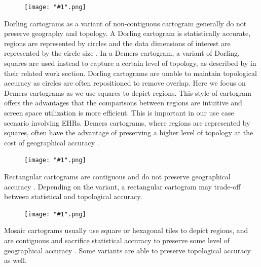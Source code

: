 \documentclass[Afour,sagev,times]{sagej}
\newcommand{\thumbnail}[2]{
    \begin{samepage}

      \setlength{\intextsep}{3pt}
      \setlength{\columnsep}{3pt}
      \begin{figure}
        \vspace{-15pt}
        \begin{center}
          \texttt{[image: "\#1".png]}
        \end{center}
      \end{figure}
      #2
      
    \end{samepage}
}
\begin{document}
\thumbnail{dorling}{
    Dorling cartograms as a variant of non-contiguous cartogram generally do not preserve geography and topology.
    A Dorling cartogram is statistically accurate, regions are represented by circles and the data dimensions of interest are represented by the circle size \cite{dorling2011Area}.
    In a Demers cartogram, a variant of Dorling, squares are used instead to capture a certain level of topology, as described by \citet{cano2015Mosaic} in their related work section.
    Dorling cartograms are unable to maintain topological accuracy as circles are often repositioned to remove overlap. Here we focus on Demers cartograms as we use squares to depict regions.
    This style of cartogram offers the advantages that the comparisons between regions are intuitive and screen space utilization is more efficient.
    This is important in our use case scenario involving EHRs.
    Demers cartograms, where regions are represented by squares, often have the advantage of preserving a higher level of topology at the cost of geographical accuracy \cite{ian2002Cartogram}.
}

\thumbnail{rectangular}{
    Rectangular cartograms are contiguous and do not preserve geographical accuracy \cite{raisz1934Rectangular, vankreveld2004Rectangular}. Depending on the variant, a rectangular cartogram may trade-off between statistical and topological accuracy.
}

\thumbnail{mosaic}{
    Mosaic cartograms usually use square or hexagonal tiles to depict regions, and are contiguous and sacrifice statistical accuracy to preserve some level of geographical accuracy \cite{cano2015Mosaic}. Some variants are able to preserve topological accuracy as well.
}
\end{document}
